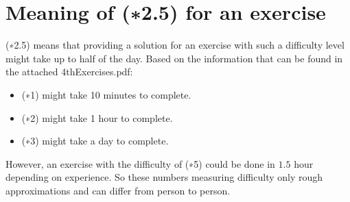 \documentclass{article}
\begin{document}
\section*{Meaning of (∗2.5) for an exercise}
 (∗2.5) means that providing a solution for an exercise with such a difficulty level might take up to half of the day.
 Based on the information that can be found in the attached 4thExercises.pdf:
 \begin{itemize}
  \item (∗1) might take 10 minutes to complete.
  \item (∗2) might take 1 hour to complete.
  \item (∗3) might take a day to complete.
 \end{itemize}

 However, an exercise with the difficulty of (∗5) could be done in $1.5$ hour depending on experience.
 So these numbers measuring difficulty only rough approximations and can differ from person to person.
 
\end{document}
